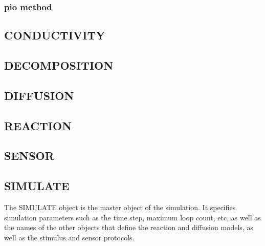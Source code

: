 \documentclass{article}
\begin{document}
\subsubsection{pio method}
\begin{keywords}
\end{keywords}


\subsection{CONDUCTIVITY}
\begin{keywords}
\end{keywords}

\subsection{DECOMPOSITION}
\begin{keywords}
\end{keywords}

\subsection{DIFFUSION}
\begin{keywords}
\end{keywords}

\subsection{REACTION}
\begin{keywords}
\end{keywords}

\subsection{SENSOR}
\begin{keywords}
\end{keywords}

\subsection{SIMULATE}

The SIMULATE object is the master object of the simulation.  It
specifies simulation parameters such as the time step, maximum loop
count, etc, as well as the names of the other objects that define the
reaction and diffusion models, as well as the stimulus and sensor
protocols.
\end{document}
